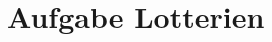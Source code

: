 \documentclass[10pt, a4paper, german]{article}
\numberwithin {equation}{section}
\begin{document}
\section{Aufgabe Lotterien}






  
\end{document}
